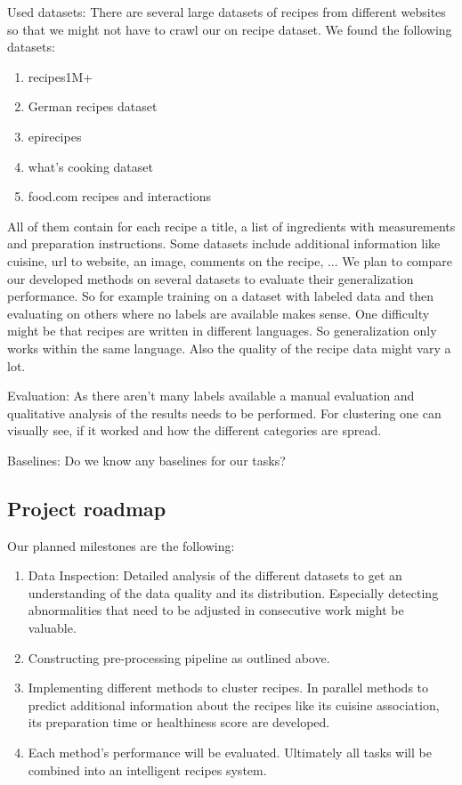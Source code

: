 \documentclass[
     12pt,         %
     a4paper,      %
     BCOR10mm,     %
     DIV14,        %
     ]{article}
\begin{document}
Used datasets: There are several large datasets of recipes from different websites so that we might not have to crawl our on recipe dataset. We found the following datasets:
\begin{enumerate}
  \item recipes1M+
  \item German recipes dataset
  \item epirecipes
  \item what's cooking dataset
  \item food.com recipes and interactions
\end{enumerate}
All of them contain for each recipe a title, a list of ingredients with measurements and preparation instructions. Some datasets include additional information like cuisine, url to website, an image, comments on the recipe, ...
We plan to compare our developed methods on several datasets to evaluate their generalization performance. So for example training on a dataset with labeled data and then evaluating on others where no labels are available makes sense. One difficulty might be that recipes are written in different languages. So generalization only works within the same language. Also the quality of the recipe data might vary a lot.

Evaluation: As there aren't many labels available a manual evaluation and qualitative analysis of the results needs to be performed. For clustering one can visually see, if it worked and how the different categories are spread.

Baselines: Do we know any baselines for our tasks?

\subsection{Project roadmap}

Our planned milestones are the following:

\begin{enumerate}
  \item Data Inspection: Detailed analysis of the different datasets to get an understanding of the data quality and its distribution. Especially detecting abnormalities that need to be adjusted in consecutive work might be valuable.
  \item Constructing pre-processing pipeline as outlined above.
  \item Implementing different methods to cluster recipes. In parallel methods to predict additional information about the recipes like its cuisine association, its preparation time or healthiness score are developed.
  \item Each method's performance will be evaluated. Ultimately all tasks will be combined into an intelligent recipes system.
\end{enumerate}
\end{document}
